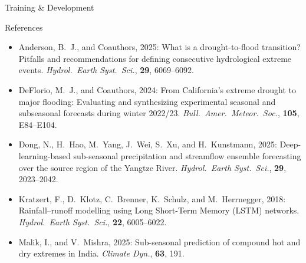 \documentclass[aspectratio=169]{beamer}
\begin{document}
\begin{frame}{Training \& Development}

\end{frame}

\begin{frame}{References}

    \scriptsize
    \begin{itemize}\setlength{\itemsep}{0.45em}

    \item Anderson, B.~J., and Coauthors, 2025: What is a drought-to-flood transition? Pitfalls and recommendations for defining consecutive hydrological extreme events. \textit{Hydrol.\ Earth Syst.\ Sci.}, \textbf{29}, 6069--6092.

    \item DeFlorio, M.~J., and Coauthors, 2024: From California's extreme drought to major flooding: Evaluating and synthesizing experimental seasonal and subseasonal forecasts during winter 2022/23. \textit{Bull.\ Amer.\ Meteor.\ Soc.}, \textbf{105}, E84--E104.

    \item Dong, N., H.~Hao, M.~Yang, J.~Wei, S.~Xu, and H.~Kunstmann, 2025: Deep-learning-based sub-seasonal precipitation and streamflow ensemble forecasting over the source region of the Yangtze River. \textit{Hydrol.\ Earth Syst.\ Sci.}, \textbf{29}, 2023--2042.

    \item Kratzert, F., D.~Klotz, C.~Brenner, K.~Schulz, and M.~Herrnegger, 2018: Rainfall--runoff modelling using Long Short-Term Memory (LSTM) networks. \textit{Hydrol.\ Earth Syst.\ Sci.}, \textbf{22}, 6005--6022.

    \item Malik, I., and V.~Mishra, 2025: Sub-seasonal prediction of compound hot and dry extremes in India. \textit{Climate Dyn.}, \textbf{63}, 191.


\end{itemize}
\end{frame}
\end{document}
